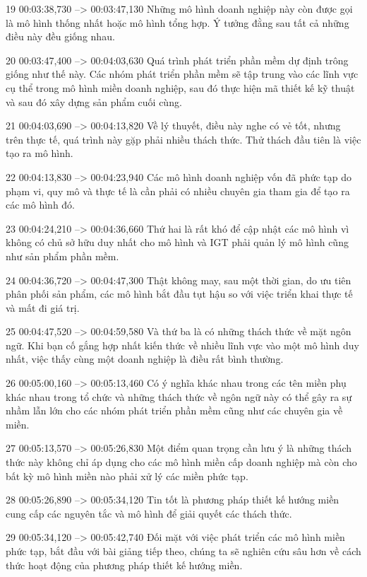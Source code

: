 19
00:03:38,730 --> 00:03:47,130
Những mô hình doanh nghiệp này còn được gọi là mô hình thống nhất hoặc mô hình tổng hợp.  Ý tưởng đằng sau tất cả những điều này đều giống nhau.

20
00:03:47,400 --> 00:04:03,630
Quá trình phát triển phần mềm dự định trông giống như thế này.  Các nhóm phát triển phần mềm sẽ tập trung vào các lĩnh vực cụ thể trong mô hình miền doanh nghiệp, sau đó thực hiện mã thiết kế kỹ thuật và sau đó xây dựng sản phẩm cuối cùng.

21
00:04:03,690 --> 00:04:13,820
Về lý thuyết, điều này nghe có vẻ tốt, nhưng trên thực tế, quá trình này gặp phải nhiều thách thức.  Thử thách đầu tiên là việc tạo ra mô hình.

22
00:04:13,830 --> 00:04:23,940
Các mô hình doanh nghiệp vốn đã phức tạp do phạm vi, quy mô và thực tế là cần phải có nhiều chuyên gia tham gia để tạo ra các mô hình đó.

23
00:04:24,210 --> 00:04:36,660
Thứ hai là rất khó để cập nhật các mô hình vì không có chủ sở hữu duy nhất cho mô hình và IGT phải quản lý mô hình cũng như sản phẩm phần mềm.

24
00:04:36,720 --> 00:04:47,300
Thật không may, sau một thời gian, do ưu tiên phân phối sản phẩm, các mô hình bắt đầu tụt hậu so với việc triển khai thực tế và mất đi giá trị.

25
00:04:47,520 --> 00:04:59,580
Và thứ ba là có những thách thức về mặt ngôn ngữ.  Khi bạn cố gắng hợp nhất kiến ​​thức về nhiều lĩnh vực vào một mô hình duy nhất, việc thấy cùng một doanh nghiệp là điều rất bình thường.

26
00:05:00,160 --> 00:05:13,460
Có ý nghĩa khác nhau trong các tên miền phụ khác nhau trong tổ chức và những thách thức về ngôn ngữ này có thể gây ra sự nhầm lẫn lớn cho các nhóm phát triển phần mềm cũng như các chuyên gia về miền.

27
00:05:13,570 --> 00:05:26,830
Một điểm quan trọng cần lưu ý là những thách thức này không chỉ áp dụng cho các mô hình miền cấp doanh nghiệp mà còn cho bất kỳ mô hình miền nào phải xử lý các miền phức tạp.

28
00:05:26,890 --> 00:05:34,120
Tin tốt là phương pháp thiết kế hướng miền cung cấp các nguyên tắc và mô hình để giải quyết các thách thức.

29
00:05:34,120 --> 00:05:42,740
Đối mặt với việc phát triển các mô hình miền phức tạp, bắt đầu với bài giảng tiếp theo, chúng ta sẽ nghiên cứu sâu hơn về cách thức hoạt động của phương pháp thiết kế hướng miền.

